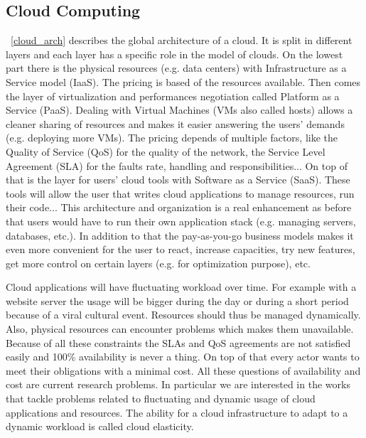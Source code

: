 \documentclass[a4paper, onecolumn, 11pt]{article}
\begin{document}
  \subsection{Cloud Computing}
  
  \figurename~\ref{cloud_arch} describes the global architecture of a cloud. It
  is split in different layers and each layer has a specific role in the model
  of clouds. On the lowest part there is the physical resources (e.g. data
  centers) with Infrastructure as a Service model (IaaS). The pricing is based
  of the resources available. Then comes the layer of virtualization and
  performances negotiation called Platform as a Service (PaaS). Dealing with
  Virtual Machines (VMs also called hosts) allows a cleaner sharing of resources
  and makes it easier answering the users' demands (e.g. deploying more VMs).
  The pricing depends of multiple factors, like the Quality of Service (QoS) for
  the quality of the network, the Service Level Agreement (SLA) for the faults
  rate, handling and responsibilities... On top of that is the layer for users'
  cloud tools with Software as a Service (SaaS). These tools will allow the user
  that writes cloud applications to manage resources, run their code... This 
  architecture and organization is a real enhancement as before that users 
  would have to run their own application stack (e.g. managing servers, 
  databases, etc.). In addition to that the pay-as-you-go business models makes 
  it even more convenient for the user to react, increase capacities, try new 
  features, get more control on certain layers (e.g. for optimization purpose), 
  etc.
  
  Cloud applications will have fluctuating workload over time. For example with
  a website server the usage will be bigger during the day or during a short
  period because of a viral cultural event. Resources should thus be managed
  dynamically. Also, physical resources can encounter problems which makes them
  unavailable. Because of all these constraints the SLAs and QoS agreements are
  not satisfied easily and 100\% availability is never a thing. On top of that
  every actor wants to meet their obligations with a minimal cost. All these
  questions of availability and cost are current research problems. In
  particular we are interested in the works that tackle problems related to
  fluctuating and dynamic usage of cloud applications and resources. The ability
  for a cloud infrastructure to adapt to a dynamic workload is called cloud
  elasticity.
  
\end{document}
